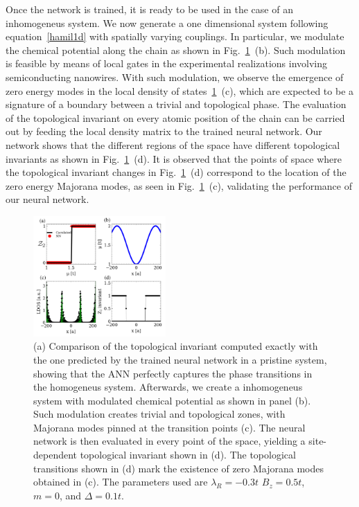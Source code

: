 Once the network is trained, it is ready to be used in the case of an inhomogeneus
system.
We now generate a one dimensional system following equation~\eqref{hamil1d} with
spatially varying couplings.
In particular, we modulate the chemical potential along the chain as shown in
Fig.~\ref{fig4}~(b). Such modulation is feasible by means of local gates in the
experimental realizations involving semiconducting
nanowires.\cite{Gul20168}
With such modulation, we observe the emergence of zero energy modes in the local
density of states~\ref{fig4}~(c), which are expected to be a signature of a
boundary between a trivial and topological phase.
The evaluation of the topological invariant on every atomic position of the
chain can be carried out by feeding the local density matrix to the trained
neural network.
Our network shows that the different regions of the space have different
topological invariants as shown in Fig.~\ref{fig4}~(d).
It is observed that the points of space where the topological invariant changes
in Fig.~\ref{fig4}~(d) correspond to the location of the zero energy Majorana
modes, as seen in Fig.~\ref{fig4}~(c), validating the performance of our neural network.


\begin{figure}[t!]
\centering
\includegraphics[width=0.45\textwidth]{ann/figures/fig4.pdf}
\vspace{-5pt}
\caption{
(a) Comparison of the topological invariant computed exactly with the one
predicted by the trained neural network in a pristine system,
showing that the ANN perfectly captures the phase transitions
in the homogeneus system. Afterwards, we
create a inhomogeneus system with modulated chemical potential as shown in
panel (b).
Such modulation creates trivial and topological zones, with Majorana modes
pinned at the transition points (c).
The neural network is then evaluated in every point of the space, yielding a
site-dependent topological invariant shown in (d). The topological
transitions shown in (d) mark the existence of zero Majorana modes obtained
in (c).
The parameters used are $\lambda_R=-0.3t$
$B_{z}=0.5t$, $m=0$, and $\Delta =0.1t$.
}
\label{fig4}
\end{figure}

